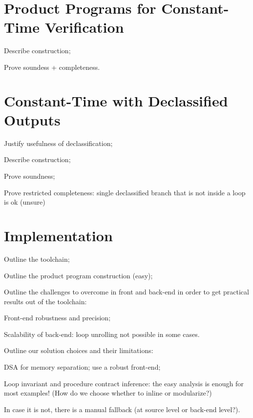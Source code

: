 \documentclass[letterpaper,10pt]{IEEEtran} %
\begin{document}
\section{Product Programs for Constant-Time Verification}

\begin{compactitem}
\item Describe construction;
\item Prove soundess + completeness.
\end{compactitem}

\section{Constant-Time with Declassified Outputs}

\begin{compactitem}
\item Justify usefulness of declassification;
\item Describe construction;
\item Prove soundness;
\item Prove restricted completeness: single declassified branch that
  is not inside a loop is ok (unsure)
\end{compactitem}

\section{Implementation}

\begin{compactitem}
\item Outline the toolchain;
\item Outline the product program construction (easy);
\item Outline the challenges to overcome in front and back-end in
  order to get practical results out of the toolchain:
  \begin{compactitem}
  \item Front-end robustness and precision;
  \item Scalability of back-end: loop unrolling not possible in some
    cases.
  \end{compactitem}
\item Outline our solution choices and their limitations:
  \begin{compactitem}
  \item DSA for memory separation; use a robust front-end;
  \item Loop invariant and procedure contract inference: the easy
    analysis is enough for most examples! (How do we choose whether to
    inline or modularize?)
  \item In case it is not, there is a manual fallback (at source level
    or back-end level?).
  \end{compactitem}
\end{compactitem}
\end{document}
